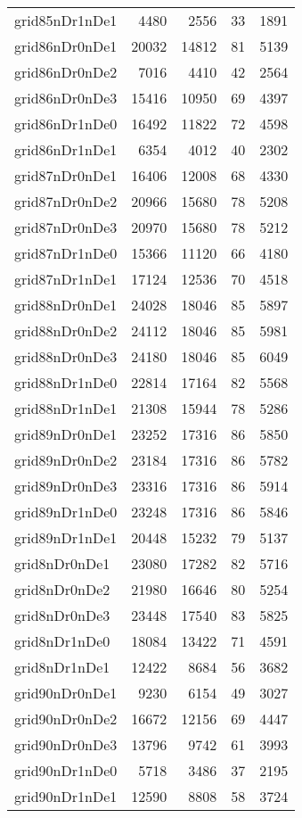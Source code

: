 \begin{longtable}{lrrrr}
grid85nDr1nDe1 & 4480 & 2556 & 33 & 1891 \\
grid86nDr0nDe1 & 20032 & 14812 & 81 & 5139 \\
grid86nDr0nDe2 & 7016 & 4410 & 42 & 2564 \\
grid86nDr0nDe3 & 15416 & 10950 & 69 & 4397 \\
grid86nDr1nDe0 & 16492 & 11822 & 72 & 4598 \\
grid86nDr1nDe1 & 6354 & 4012 & 40 & 2302 \\
grid87nDr0nDe1 & 16406 & 12008 & 68 & 4330 \\
grid87nDr0nDe2 & 20966 & 15680 & 78 & 5208 \\
grid87nDr0nDe3 & 20970 & 15680 & 78 & 5212 \\
grid87nDr1nDe0 & 15366 & 11120 & 66 & 4180 \\
grid87nDr1nDe1 & 17124 & 12536 & 70 & 4518 \\
grid88nDr0nDe1 & 24028 & 18046 & 85 & 5897 \\
grid88nDr0nDe2 & 24112 & 18046 & 85 & 5981 \\
grid88nDr0nDe3 & 24180 & 18046 & 85 & 6049 \\
grid88nDr1nDe0 & 22814 & 17164 & 82 & 5568 \\
grid88nDr1nDe1 & 21308 & 15944 & 78 & 5286 \\
grid89nDr0nDe1 & 23252 & 17316 & 86 & 5850 \\
grid89nDr0nDe2 & 23184 & 17316 & 86 & 5782 \\
grid89nDr0nDe3 & 23316 & 17316 & 86 & 5914 \\
grid89nDr1nDe0 & 23248 & 17316 & 86 & 5846 \\
grid89nDr1nDe1 & 20448 & 15232 & 79 & 5137 \\
grid8nDr0nDe1 & 23080 & 17282 & 82 & 5716 \\
grid8nDr0nDe2 & 21980 & 16646 & 80 & 5254 \\
grid8nDr0nDe3 & 23448 & 17540 & 83 & 5825 \\
grid8nDr1nDe0 & 18084 & 13422 & 71 & 4591 \\
grid8nDr1nDe1 & 12422 & 8684 & 56 & 3682 \\
grid90nDr0nDe1 & 9230 & 6154 & 49 & 3027 \\
grid90nDr0nDe2 & 16672 & 12156 & 69 & 4447 \\
grid90nDr0nDe3 & 13796 & 9742 & 61 & 3993 \\
grid90nDr1nDe0 & 5718 & 3486 & 37 & 2195 \\
grid90nDr1nDe1 & 12590 & 8808 & 58 & 3724 \\

\end{longtable}
